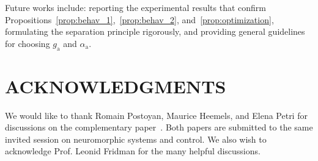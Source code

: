 \documentclass{article}
\newcommand{\ra}{\mathrm{a}}
\theoremstyle{definition}
\theoremstyle{remark}
\begin{document}
Future works include: reporting the experimental results that confirm Propositions~\ref{prop:behav_1},~\ref{prop:behav_2}, and~\ref{prop:optimization}, formulating the separation principle rigorously, and providing general guidelines for choosing $g_\ra$ and $\alpha_\ra$.



\section{ACKNOWLEDGMENTS}

We would like to thank Romain Postoyan, Maurice Heemels, and Elena Petri for discussions on the complementary
paper~\cite{petri2025}. Both papers are submitted to the same invited session on neuromorphic systems and control. We also wish to acknowledge Prof. Leonid Fridman for the many helpful discussions.





\end{document}
